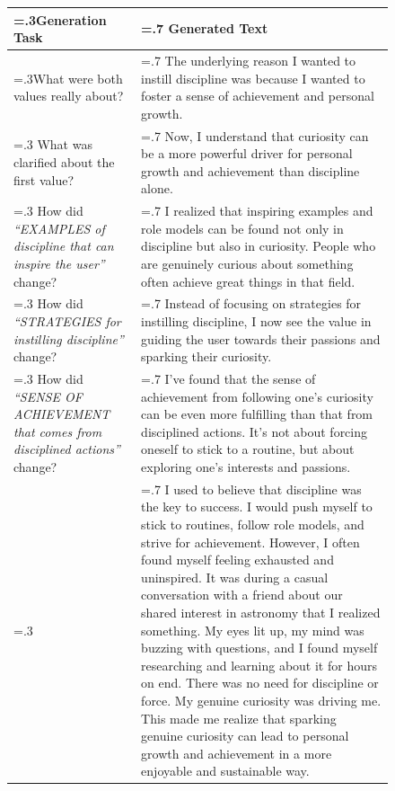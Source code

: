 \documentclass{article}
\theoremstyle{definition}
\begin{document}
\begin{figure}[htbp]
    \begin{minipage}{\textwidth} %
        \centering
        \begin{tabularx}{\textwidth}{|>{\hsize=.3\hsize}X|>{\hsize=.7\hsize}X|}
        \hline
        \textbf{Generation Task} & \textbf{Generated Text} \\
        \hline
        \cellcolor{gray!10}What were both values really about? & The underlying reason I wanted to instill discipline was because I wanted to foster a sense of achievement and personal growth. \\
        \hline
        \cellcolor{gray!10}What was clarified about the first value? & Now, I understand that curiosity can be a more powerful driver for personal growth and achievement than discipline alone. \\
        \hline
        \cellcolor{gray!10}How did \textit{“EXAMPLES of discipline that can inspire the user”} change? & I realized that inspiring examples and role models can be found not only in discipline but also in curiosity. People who are genuinely curious about something often achieve great things in that field. \\
        \hline
        \cellcolor{gray!10}How did \textit{“STRATEGIES for instilling discipline”} change? & Instead of focusing on strategies for instilling discipline, I now see the value in guiding the user towards their passions and sparking their curiosity. \\
        \hline
        \cellcolor{gray!10}How did \textit{“SENSE OF ACHIEVEMENT that comes from disciplined actions”} change? & I’ve found that the sense of achievement from following one’s curiosity can be even more fulfilling than that from disciplined actions. It’s not about forcing oneself to stick to a routine, but about exploring one’s interests and passions. \\
        \hline
        \cellcolor{gray!10}{\textbf{Final Story (shown to the participant)}} & I used to believe that discipline was the key to success. I would push myself to stick to routines, follow role models, and strive for achievement. However, I often found myself feeling exhausted and uninspired. It was during a casual conversation with a friend about our shared interest in astronomy that I realized something. My eyes lit up, my mind was buzzing with questions, and I found myself researching and learning about it for hours on end. There was no need for discipline or force. My genuine curiosity was driving me. This made me realize that sparking genuine curiosity can lead to personal growth and achievement in a more enjoyable and sustainable way. \\
        \hline
        \end{tabularx}
    \end{minipage}
    

\end{figure}
\end{document}
